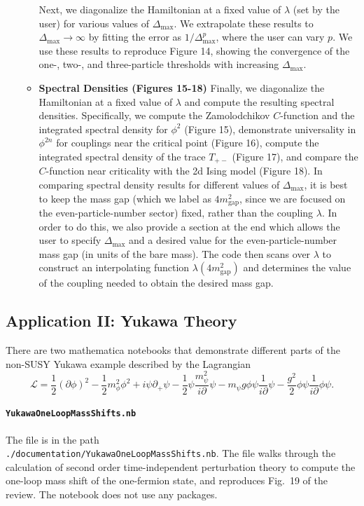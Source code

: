 \documentclass[12pt]{article}
\newcommand{\Lcal}{{\mathcal L}}
\newcommand\De\Delta
\newcommand{\p}{\partial}
\newcommand{\ra}{\rightarrow}
\newcommand{\gap}{\textrm{gap}}
\newcommand{\Dmax}{\De_{\max}}
\begin{document}
\begin{itemize}
\begin{itemize}
Next, we diagonalize the Hamiltonian at a fixed value of $\lambda$ (set by the user) for various values of $\Dmax$. We extrapolate these results to $\Dmax \ra \infty$ by fitting the error as $1/\Dmax^p$, where the user can vary $p$. We use these results to reproduce Figure 14, showing the convergence of the one-, two-, and three-particle thresholds with increasing $\Dmax$.
\item \textbf{Spectral Densities (Figures 15-18)} \newline
Finally, we diagonalize the Hamiltonian at a fixed value of $\lambda$ and compute the resulting spectral densities. Specifically, we compute the Zamolodchikov $C$-function and the integrated spectral density for $\phi^2$ (Figure 15), demonstrate universality in $\phi^{2n}$ for couplings near the critical point (Figure 16), compute the integrated spectral density of the trace $T_{+-}$ (Figure 17), and compare the $C$-function near criticality with the 2d Ising model (Figure 18). In comparing spectral density results for different values of $\Dmax$, it is best to keep the mass gap (which we label as $4m_\gap^2$, since we are focused on the even-particle-number sector) fixed, rather than the coupling $\lambda$. In order to do this, we also provide a section at the end which allows the user to specify $\Dmax$ and a desired value for the even-particle-number mass gap (in units of the bare mass). The code then scans over $\lambda$ to construct an interpolating function $\lambda(4m_{\gap}^2)$ and determines the value of the coupling needed to obtain the desired mass gap.
\end{itemize}
\end{itemize}

\subsection{Application II: Yukawa Theory}
There are two mathematica notebooks that demonstrate different parts of the non-SUSY Yukawa example described by the Lagrangian
\begin{equation}
\Lcal = \frac{1}{2} (\p \phi)^2 - \frac{1}{2}m_\phi^2 \phi^2 + i\psi\p_+\psi - \frac{1}{2} \psi\frac{m_\psi^2 }{i\p} \psi - m_\psi g \phi \psi\frac{1}{i\p} \psi - \frac{g^2}{2} \phi  \psi\frac{1}{i\p} \phi \psi  .
\label{eq:YukawaLCLag2}
\end{equation}

\paragraph{{\tt YukawaOneLoopMassShifts.nb}}
The file is in the path \\{\tt ./documentation/YukawaOneLoopMassShifts.nb}. The file walks through the calculation of second order time-independent perturbation theory to compute the one-loop mass shift of the one-fermion state, and reproduces Fig.~19 of the review. The notebook does not use any packages.
\end{document}
